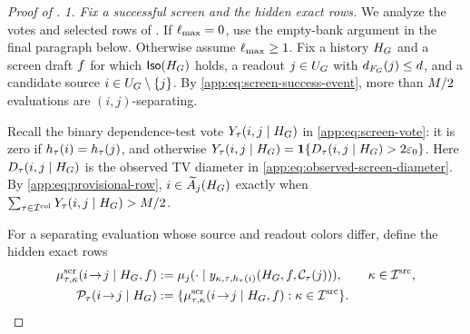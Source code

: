 \begin{proof}[Proof of \AppLowDegreeScreenRef]

\emph{1. Fix a successful screen and the hidden exact rows.}
We analyze the votes and selected rows of .
If $\MaxBankSize=0$, use the empty-bank argument in the final paragraph
below.  Otherwise assume $\MaxBankSize\ge1$.
Fix a history $\History$ and a screen draft $\DraftFiller$ for which
$\ScreenSuccess{\History}$ holds, a readout
$j\in\ResidualPositions$ with
$d_{\ResidualForest}(j)\le\DegreeCutoff$, and a candidate source
$i\in\ResidualPositions\setminus\{j\}$.  By
\eqref{app:eq:screen-success-event}, more than $\ColoringCount/2$
evaluations are $(i,j)$-separating.

Recall the binary dependence-test vote $\ScreenVote{\tau}{i}{j}$ in
\eqref{app:eq:screen-vote}: it is zero if
$\ColorHash{\tau}{i}=\ColorHash{\tau}{j}$, and otherwise
$\ScreenVote{\tau}{i}{j}
 =\mathbf 1\{\ScreenDiameter{\tau}{i}{j}>2\RowTVError\}$.
Here $\ScreenDiameter{\tau}{i}{j}$ is the observed TV diameter in
\eqref{app:eq:observed-screen-diameter}.
By \eqref{app:eq:provisional-row}, $i\in\CandidateRow{j}$ exactly when
$\sum_{\tau\in\ColoringIndexSet}\ScreenVote{\tau}{i}{j}
 >\ColoringCount/2$.

For a separating evaluation whose source and readout colors differ, define
the hidden exact rows
\begin{align}
 \ProbeExactRow{\tau}{\kappa}{i}{j}
 &:=\ExactRow{
   \ProbeState{\kappa}{\tau}{\ColorHash{\tau}{i}}
              {\ReadoutChunkOf{\tau}{j}}}{j},
 \qquad \kappa\in\ScreenColumnSet,
 \label{app:eq:hidden-screen-rows}\\
 \ExactRowFamily{\tau}{i}{j}
 &:=\{\ProbeExactRow{\tau}{\kappa}{i}{j}:
             \kappa\in\ScreenColumnSet\}.
 \label{app:eq:hidden-screen-row-family}
\end{align}


\end{proof}
